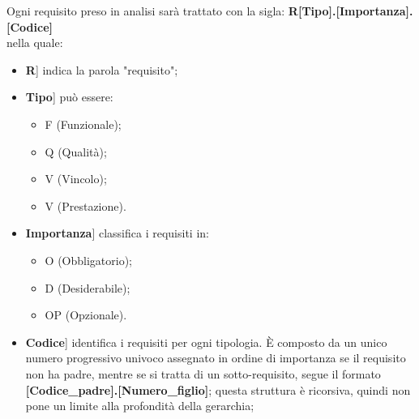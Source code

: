 \documentclass[10pt, a4paper]{article}
\begin{document}
Ogni requisito preso in analisi sarà trattato con la sigla:
\textbf{R[Tipo].[Importanza].[Codice]}\\
nella quale:
\begin{itemize}
\item \lbrack \textbf{R}] indica la parola "requisito";
\item \lbrack \textbf{Tipo}] può essere:
    \begin{itemize}
	    \item F (Funzionale);
	    \item Q (Qualità);
	    \item V (Vincolo);
        \item V (Prestazione).
    \end{itemize}
\item \lbrack \textbf{Importanza}] classifica i requisiti in:
    \begin{itemize}
        \item O (Obbligatorio);
		\item D (Desiderabile);
		\item OP (Opzionale).
    \end{itemize}
\item \lbrack \textbf{Codice}] identifica i requisiti per ogni tipologia. È composto da un unico numero progressivo univoco assegnato in ordine di importanza se il requisito non ha padre, mentre se si tratta di un sotto-requisito, segue il formato \textbf{[Codice\_padre].[Numero\_figlio]}; questa struttura è ricorsiva, quindi non pone un limite alla profondità della gerarchia;
\end{itemize}
\end{document}
